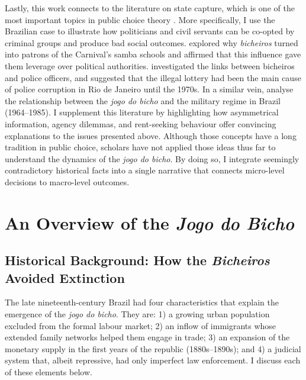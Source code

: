\documentclass[a4paper,12pt]{article}
\begin{document}
Lastly, this work connects to the literature on state capture, which is one of the most important topics in public choice theory \citep{rose1978corruption,shleifer2002grabbing,tollison1982rent}. More specifically, I use the Brazilian case to illustrate how politicians and civil servants can be co-opted by criminal groups and produce bad social outcomes. \citet{queiroz1992carnaval} explored why \textit{bicheiros} turned into patrons of the Carnival's samba schools and affirmed that this influence gave them leverage over political authorities. \citet{misse2007illegal} investigated the links between bicheiros and police officers, and suggested that the illegal lottery had been the main cause of police corruption in Rio de Janeiro until the 1970s. In a similar vein, \citet{jupiara2015poroes} analyse the relationship between the \textit{jogo do bicho} and the military regime in Brazil (1964--1985). I supplement this literature by highlighting how asymmetrical information, agency dilemmas, and rent-seeking behaviour offer convincing explanations to the issues presented above. Although those concepts have a long tradition in public choice, scholars have not applied those ideas thus far to understand the dynamics of the \textit{jogo do bicho}. By doing so, I integrate seemingly contradictory historical facts into a single narrative that connects micro-level decisions to macro-level outcomes. 

\section{An Overview of the \textit{Jogo do Bicho}}%
\label{sec:overview}

\subsection{Historical Background: How the \textit{Bicheiros} Avoided Extinction}%
\label{sub:historical_background}

The late nineteenth-century Brazil had four characteristics that explain the emergence of the \textit{jogo do bicho}. They are: 1) a growing urban population excluded from the formal labour market; 2) an inflow of immigrants whose extended family networks helped them engage in trade; 3) an expansion of the monetary supply in the first years of the republic (1880s--1890s); and 4) a judicial system that, albeit repressive, had only imperfect law enforcement. I discuss each of these elements below.
\end{document}

